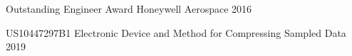 \documentclass[]{awesome-cv}
\begin{document}
\vspace{-7mm}

\begin{cvhonors}
	\cvhonor
	{Outstanding Engineer Award}
	{Honeywell Aerospace }
	{}
	{2016}
\end{cvhonors}

\begin{cvhonors}
	\cvhonor
	{US10447297B1}
	{Electronic Device and Method for Compressing Sampled Data }
	{}
	{2019}
\end{cvhonors}
\end{document}
